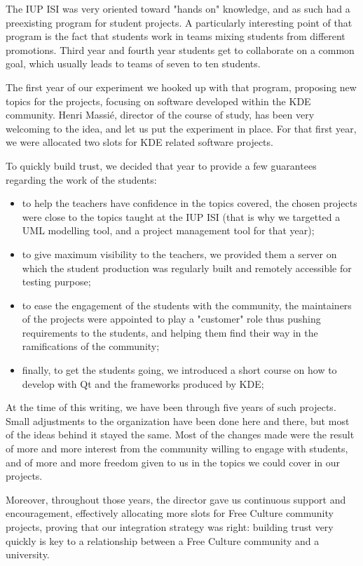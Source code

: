 The IUP ISI was very oriented toward "hands on" knowledge, and as such had a preexisting program for student projects. A particularly interesting point of that program is the fact that students work in teams mixing students from different promotions. Third year and fourth year students get to collaborate on a common goal, which usually leads to teams of seven to ten students.

The first year of our experiment we hooked up with that program, proposing new topics for the projects, focusing on software developed within the KDE community. Henri Massié, director of the course of study, has been very welcoming to the idea, and let us put the experiment in place. For that first year, we were allocated two slots for KDE related software projects.

To quickly build trust, we decided that year to provide a few guarantees regarding the work of the students:
\begin{itemize}
  \item to help the teachers have confidence in the topics covered, the chosen projects were close to the topics taught at the IUP ISI (that is why we targetted a UML modelling tool, and a project management tool for that year);
  \item to give maximum visibility to the teachers, we provided them a server on which the student production was regularly built and remotely accessible for testing purpose;
  \item to ease the engagement of the students with the community, the maintainers of the projects were appointed to play a "customer" role thus pushing requirements to the students, and helping them find their way in the ramifications of the community;
  \item finally, to get the students going, we introduced a short course on how to develop with Qt and the frameworks produced by KDE;
\end{itemize}

At the time of this writing, we have been through five years of such projects. Small adjustments to the organization have been done here and there, but most of the ideas behind it stayed the same. Most of the changes made were the result of more and more interest from the community willing to engage with students, and of more and more freedom given to us in the topics we could cover in our projects.

Moreover, throughout those years, the director gave us continuous support and encouragement, effectively allocating more slots for Free Culture community projects, proving that our integration strategy was right: building trust very quickly is key to a relationship between a Free Culture community and a university.

